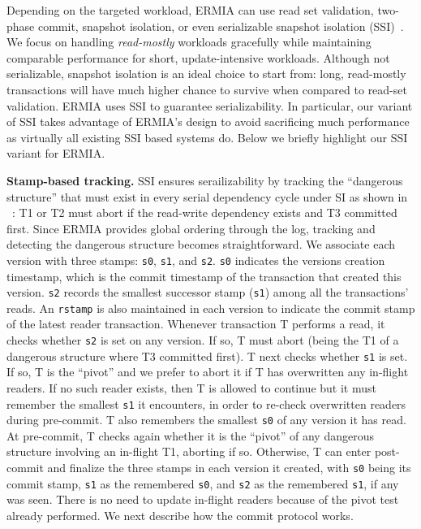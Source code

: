 Depending on the targeted workload, ERMIA can use read set validation, two-phase commit, snapshot isolation, or even serializable snapshot isolation (SSI)~\cite{Cahill08RF}. We focus on handling \textit{read-mostly} workloads gracefully while maintaining comparable performance for short, update-intensive workloads. Although not serializable, snapshot isolation is an ideal choice to start from: long, read-mostly transactions will have much higher chance to survive when compared to read-set validation. ERMIA uses SSI to guarantee serializability. In particular, our variant of SSI takes advantage of ERMIA's design to avoid sacrificing much performance as virtually all existing SSI based systems do. Below we briefly highlight our SSI variant for ERMIA.


{\bf Stamp-based tracking.}
SSI ensures serailizability by tracking the ``dangerous structure'' that must exist in every serial dependency cycle under SI as shown in ~\cite{Cahill08RF}: T1 or T2 must abort if the read-write dependency exists and T3 committed first. Since ERMIA provides global ordering through the log, tracking and detecting the dangerous structure becomes straightforward. We associate each version with three stamps: \texttt{s0}, \texttt{s1}, and \texttt{s2}. \texttt{s0} indicates the versions creation timestamp, which is the commit timestamp of the transaction that created this version. \texttt{s2} records the smallest successor stamp (\texttt{s1}) among all the transactions' reads. An \texttt{rstamp} is also maintained in each version to indicate the commit stamp of the latest reader transaction. Whenever transaction T performs a read, it checks whether \texttt{s2} is set on any version. If so, T must abort (being the T1 of a dangerous structure where T3 committed first). T next checks whether \texttt{s1} is set. If so, T is the ``pivot'' and we prefer to abort it if T has overwritten any in-flight readers. If no such reader exists, then T is allowed to continue but it must remember the smallest \texttt{s1} it encounters, in order to re-check overwritten readers during pre-commit. T also remembers the smallest \texttt{s0} of any version it has read. At pre-commit, T checks again whether it is the ``pivot'' of any dangerous structure involving an in-flight T1, aborting if so. Otherwise, T can enter post-commit and finalize the three stamps in each version it created, with \texttt{s0} being its commit stamp, \texttt{s1} as the remembered \texttt{s0}, and \texttt{s2} as the remembered \texttt{s1}, if any was seen. There is no need to update in-flight readers because of the pivot test already performed. We next describe how the commit protocol works.

